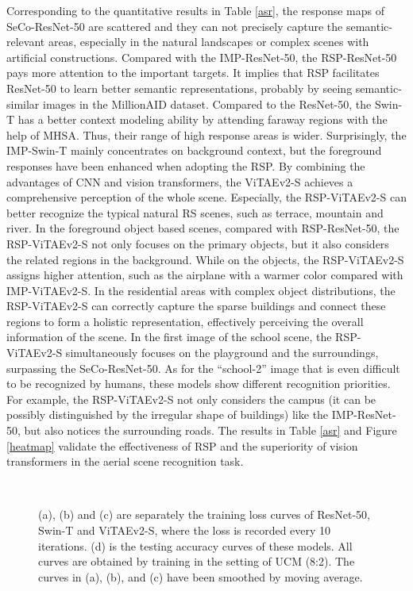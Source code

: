 \documentclass[10pt, journal,twoside]{IEEEtran}
\begin{document}
Corresponding to the quantitative results in Table \ref{asr}, the response maps of SeCo-ResNet-50 are scattered and they can not precisely capture the semantic-relevant areas, especially in the natural landscapes or complex scenes with artificial constructions. Compared with the IMP-ResNet-50, the RSP-ResNet-50 pays more attention to the important targets. It implies that RSP facilitates ResNet-50 to learn better semantic representations, probably by seeing semantic-similar images in the MillionAID dataset. Compared to the ResNet-50, the Swin-T has a better context modeling ability by attending faraway regions with the help of MHSA. Thus, their range of high response areas is wider. Surprisingly, the IMP-Swin-T mainly concentrates on background context, but the foreground responses have been enhanced when adopting the RSP. By combining the advantages of CNN and vision transformers, the ViTAEv2-S achieves a comprehensive perception of the whole scene. Especially, the RSP-ViTAEv2-S can better recognize the typical natural RS scenes, such as terrace, mountain and river. In the foreground object based scenes, compared with RSP-ResNet-50, the RSP-ViTAEv2-S not only focuses on the primary objects, but it also considers the related regions in the background. While on the objects, the RSP-ViTAEv2-S assigns higher attention, such as the airplane with a warmer color compared with IMP-ViTAEv2-S. In the residential areas with complex object distributions, the RSP-ViTAEv2-S can correctly capture the sparse buildings and connect these regions to form a holistic representation, effectively perceiving the overall information of the scene. In the first image of the school scene, the RSP-ViTAEv2-S simultaneously focuses on the playground and the surroundings, surpassing the SeCo-ResNet-50. As for the ``school-2'' image that is even difficult to be recognized by humans, these models show different recognition priorities. For example, the RSP-ViTAEv2-S not only considers the campus (it can be possibly distinguished by the irregular shape of buildings) like the IMP-ResNet-50, but also notices the surrounding roads. The results in Table \ref{asr} and Figure \ref{heatmap} validate the effectiveness of RSP and the superiority of vision transformers in the aerial scene recognition task.

\begin{figure}[t]
  \centering
  \\

  \caption{(a), (b) and (c) are separately the training loss curves of ResNet-50, Swin-T and ViTAEv2-S, where the loss is recorded every 10 iterations. (d) is the testing accuracy curves of these models. All curves are obtained by training in the setting of UCM (8:2). The curves in (a), (b), and (c) have been smoothed by moving average.}
  \label{loss_curve}
\end{figure}
\end{document}
